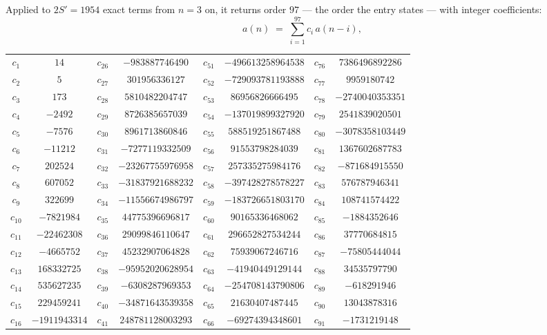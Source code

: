 \documentclass[11pt,a4paper]{article}
\theoremstyle{plain}
\theoremstyle{definition}
\begin{document}
Applied to $2S'=1954$ exact terms from $n=3$ on, it returns order $97$ --- the
order the entry states --- with integer coefficients:
\[
a(n)\;=\;\sum_{i=1}^{97}c_i\,a(n-i),
\]
\begin{center}\small
\begin{tabular}{cccccccc}
$c_{1}$ & $14$ & $c_{26}$ & $-983887746490$ & $c_{51}$ & $-496613258964538$ & $c_{76}$ & $7386496892286$ \\
$c_{2}$ & $5$ & $c_{27}$ & $301956336127$ & $c_{52}$ & $-729093781193888$ & $c_{77}$ & $9959180742$ \\
$c_{3}$ & $173$ & $c_{28}$ & $5810482204747$ & $c_{53}$ & $86956826666495$ & $c_{78}$ & $-2740040353351$ \\
$c_{4}$ & $-2492$ & $c_{29}$ & $8726385657039$ & $c_{54}$ & $-137019899327920$ & $c_{79}$ & $2541839020501$ \\
$c_{5}$ & $-7576$ & $c_{30}$ & $8961713860846$ & $c_{55}$ & $588519251867488$ & $c_{80}$ & $-3078358103449$ \\
$c_{6}$ & $-11212$ & $c_{31}$ & $-7277119332509$ & $c_{56}$ & $91553798284039$ & $c_{81}$ & $1367602687783$ \\
$c_{7}$ & $202524$ & $c_{32}$ & $-23267755976958$ & $c_{57}$ & $257335275984176$ & $c_{82}$ & $-871684915550$ \\
$c_{8}$ & $607052$ & $c_{33}$ & $-31837921688232$ & $c_{58}$ & $-397428278578227$ & $c_{83}$ & $576787946341$ \\
$c_{9}$ & $322699$ & $c_{34}$ & $-11556674986797$ & $c_{59}$ & $-183726651803170$ & $c_{84}$ & $108741574422$ \\
$c_{10}$ & $-7821984$ & $c_{35}$ & $44775396696817$ & $c_{60}$ & $90165336468062$ & $c_{85}$ & $-1884352646$ \\
$c_{11}$ & $-22462308$ & $c_{36}$ & $29099846110647$ & $c_{61}$ & $296652827534244$ & $c_{86}$ & $37770684815$ \\
$c_{12}$ & $-4665752$ & $c_{37}$ & $45232907064828$ & $c_{62}$ & $75939067246716$ & $c_{87}$ & $-75805444044$ \\
$c_{13}$ & $168332725$ & $c_{38}$ & $-95952020628954$ & $c_{63}$ & $-41940449129144$ & $c_{88}$ & $34535797790$ \\
$c_{14}$ & $535627235$ & $c_{39}$ & $-6308287969353$ & $c_{64}$ & $-254708143790806$ & $c_{89}$ & $-618291946$ \\
$c_{15}$ & $229459241$ & $c_{40}$ & $-34871643539358$ & $c_{65}$ & $21630407487445$ & $c_{90}$ & $13043878316$ \\
$c_{16}$ & $-1911943314$ & $c_{41}$ & $248781128003293$ & $c_{66}$ & $-69274394348601$ & $c_{91}$ & $-1731219148$ \\

\end{tabular}
\end{center}
\end{document}
